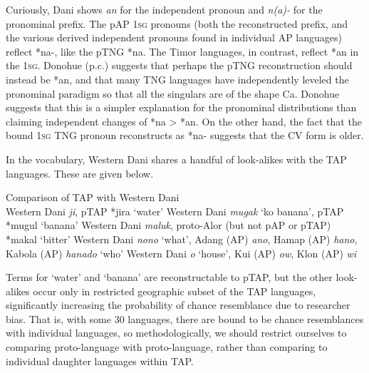 Curiously, Dani shows \textit{an} for the independent pronoun and \textit{n(a)-} for the pronominal prefix. The pAP \textsc{1sg} pronouns (both the reconstructed prefix, and the various derived independent pronouns found in individual AP languages) reflect *na-, like the pTNG *na. The Timor languages, in contrast, reflect *an in the \textsc{1sg}. Donohue (p.c.) suggests that perhaps the pTNG reconstruction should instead be *an, and that many TNG languages have independently leveled the pronominal paradigm so that all the singulars are of the shape Ca. Donohue suggests that this is a simpler explanation for the pronominal distributions than claiming independent changes of *na {\textgreater} *an. On the other hand, the fact that the bound \textsc{1sg} TNG pronoun reconstructs as *na- suggests that the CV form is older.

In the vocabulary, Western Dani shares a handful of look-alikes with the TAP languages. These are given below.

\ea%
  Comparison of TAP with Western Dani \citep{PurbaEtAl1993} \\
  \ea Western Dani \textit{ji}, pTAP *jira `water'
  \ex Western Dani \textit{mugak} `ko banana', pTAP *mugul `banana'
  \ex Western Dani \textit{maluk}, proto-Alor (but not pAP or pTAP) *makal `bitter'
  \ex Western Dani \textit{nono} `what',  Adang (AP) \textit{ano}, Hamap (AP) \textit{hano}, Kabola (AP) \textit{hanado} `who'
  \ex Western Dani \textit{o} `house', Kui (AP) \textit{ow}, Klon (AP) \textit{{\textschwa}}\textit{wi}
  \z
\z


Terms for `water' and `banana' are reconstructable to pTAP, but the other look-alikes occur only in restricted geographic subset of the TAP languages, significantly increasing the probability of chance resemblance due to researcher bias. That is, with some 30 languages, there are bound to be chance resemblances with individual languages, so methodologically, we should restrict ourselves to comparing proto-language with proto-language, rather than comparing to individual daughter languages within TAP.

